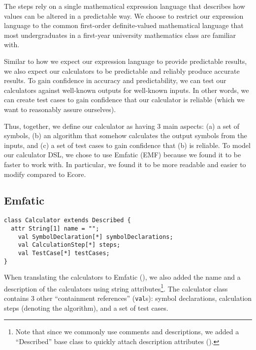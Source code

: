 \documentclass[11pt,fleqn]{article}
\begin{document}
The steps rely on a single mathematical expression language that describes how
values can be altered in a predictable way. We choose to restrict our expression
language to the common first-order definite-valued mathematical language that
most undergraduates in a first-year university mathematics class are familiar
with.

Similar to how we expect our expression language to provide predictable results,
we also expect our calculators to be predictable and reliably produce accurate
results. To gain confidence in accuracy and predictability, we can test our
calculators against well-known outputs for well-known inputs. In other words, we
can create test cases to gain confidence that our calculator is reliable (which
we want to reasonably assure ourselves).

Thus, together, we define our calculator as having 3 main aspects: (a) a set of
symbols, (b) an algorithm that somehow calculates the output symbols from the
inputs, and (c) a set of test cases to gain confidence that (b) is reliable. To
model our calculator DSL, we chose to use Emfatic (EMF) because we found it to
be faster to work with. In particular, we found it to be more readable and
easier to modify compared to Ecore.

\subsection{Emfatic}
\label{sec:modelling:subsec:emfatic}

\begin{lstlisting}[caption={Calculator EMF},label={lst:calculator}]
class Calculator extends Described {
  attr String[1] name = "";
	val SymbolDeclaration[*] symbolDeclarations;
	val CalculationStep[*] steps;
	val TestCase[*] testCases;
}
\end{lstlisting}

When translating the calculators to Emfatic (), we also
added the name and a description of the calculators using string
attributes\footnote{Note that since we commonly use comments and descriptions,
we added a ``Described'' base class to quickly attach description attributes
().}. The calculator class contains 3 other ``containment
references'' (\lstinline{val}s): symbol declarations, calculation steps
(denoting the algorithm), and a set of test cases.
\end{document}
